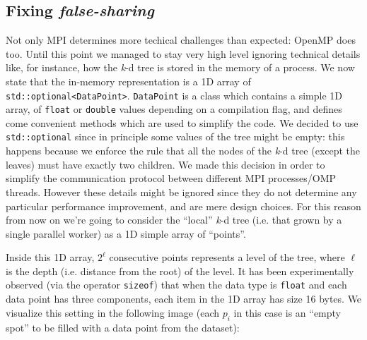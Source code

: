 \documentclass{article}
\newcommand{\kdtree}{\emph{k}-d tree}
\begin{document}
\subsection{Fixing \emph{false-sharing}}
Not only MPI determines more techical challenges than expected: OpenMP does too.
Until this point we managed to stay very high level ignoring technical details
like, for instance, how the \kdtree{} is stored in the memory of a process. We
now state that the in-memory representation is a 1D array of
\texttt{std::optional<DataPoint>}. \texttt{DataPoint} is a class which contains
a simple 1D array, of \texttt{float} or \texttt{double} values depending on a
compilation flag, and defines come convenient methods which are used to simplify
the code. We decided to use \texttt{std::optional} since in principle some
values of the tree might be empty: this happens because we enforce the rule that
all the nodes of the \kdtree{} (except the leaves) must have exactly two
children. We made this decision in order to simplify the communication protocol
between different MPI processes/OMP threads. However these details might be
ignored since they do not determine any particular performance improvement, and
are mere design choices. For this reason from now on we're going to consider
the ``local'' \kdtree{} (i.e. that grown by a single parallel worker) as a 1D
simple array of ``points''.

Inside this 1D array, $2^\ell$ consecutive points represents a level of the
tree, where $\ell$ is the depth (i.e. distance from the root) of the level.
It has been experimentally observed (via the operator \texttt{sizeof}) that when
the data type is \texttt{float} and each data point has three components, each
item in the 1D array has size 16 bytes. We visualize this setting in the
following image (each $p_i$ in this case is an ``empty spot'' to be filled with
a data point from the dataset):

\begin{figure}[H]
    \centering
\end{figure}
\end{document}
